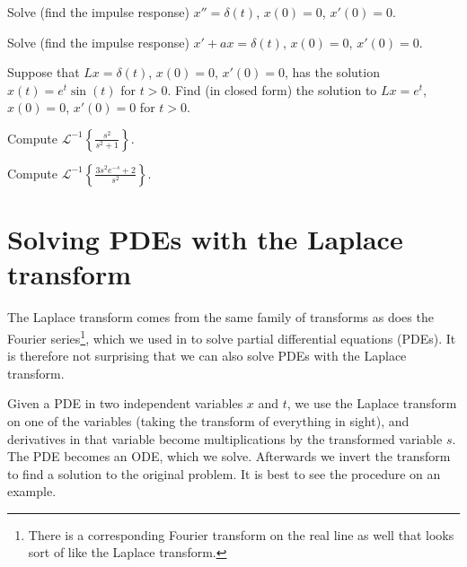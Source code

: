 \setcounter{exercise}{100}

\begin{exercise}
Solve (find the impulse response)
$x'' = \delta(t)$, $x(0) = 0$, $x'(0)=0$.
\end{exercise}

\begin{exercise}
Solve (find the impulse response)
$x' + a x = \delta(t)$, $x(0) = 0$, $x'(0)=0$.
\end{exercise}

\begin{exercise}
Suppose that $L x = \delta(t)$, $x(0) = 0$, $x'(0) = 0$, has the solution
$x(t) = e^t \sin(t)$ for $t > 0$.  Find (in closed form) the solution to
$Lx = e^t$, $x(0) = 0$, $x'(0) = 0$ for $t > 0$.
\end{exercise}

\begin{exercise}
Compute
${\mathcal{L}}^{-1} \left\{ \frac{s^2}{s^2+1} \right\}$.
\end{exercise}

\begin{exercise}
Compute
${\mathcal{L}}^{-1} \left\{ \frac{3 s^2 e^{-s} + 2}{s^2} \right\}$.
\end{exercise}


\sectionnewpage
\section{Solving PDEs with the Laplace transform}
\label{laplacepde:section}


The Laplace transform comes from the same family of transforms as does the
Fourier series\footnote{There is a corresponding Fourier transform
on the real line as well that looks sort of like the Laplace transform.},
which we used in  to solve partial differential
equations (PDEs).
It is therefore not surprising that we can also solve PDEs with the Laplace
transform.

Given a PDE in two independent variables $x$ and $t$,  we use the
Laplace transform on one of the variables (taking the transform
of everything in sight), and derivatives in that variable become
multiplications by the transformed variable $s$.
The PDE becomes an ODE, which we solve.
Afterwards we invert the transform to find a solution to the original
problem.
It is best to see the procedure on an example.

